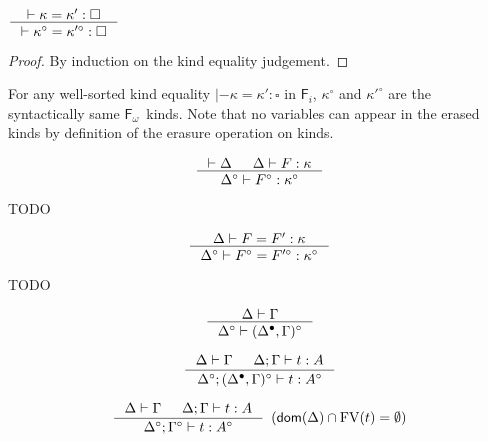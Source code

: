\documentclass{llncs}
\newcommand{\Fi}{\ensuremath{\mathsf{F}_i}}
\newcommand{\Fw}{\ensuremath{\mathsf{F}_\omega}}
\newcommand{\dom}{\mathop{\mathsf{dom}}}
\newcommand{\FV}{\mathop{\mathrm{FV}}}
\begin{document}
\begin{theorem}\label{thm:ierasekindeq}
$ \inference{|- \kappa=\kappa':\square}
	{|- \kappa^\circ=\kappa'^\circ:\square}
$
\end{theorem}
\begin{proof}
	By induction on the kind equality judgement.
\end{proof}
\begin{remark}
For any well-sorted kind equality $|- \kappa=\kappa':\square$ in \Fi,
$\kappa^\circ$ and $\kappa'^\circ$ are the syntactically same \Fw\ kinds.
Note that no variables can appear in the erased kinds by definition of
the erasure operation on kinds.
\end{remark}

\begin{theorem}
\label{thm:ierasekinding}
\[ \inference{|- \Delta & \Delta |- F : \kappa}
		{\Delta^\circ |- F^\circ : \kappa^\circ}
\]
\end{theorem}
\begin{remark} TODO
\end{remark}


\begin{theorem}
\label{thm:ierasetyconeq}
\[ \inference{\Delta |- F=F':\kappa}
		{\Delta^\circ |- F^\circ=F'^\circ:\kappa^\circ}
\]
\end{theorem}
\begin{remark} TODO
\end{remark}

\begin{theorem}
\label{thm:ierasetmctxivs}
\[ \inference{\Delta |- \Gamma}{\Delta^\circ |- (\Delta^\bullet,\Gamma)^\circ}
\]
\end{theorem}

\begin{theorem}
\label{thm:ierasetypingall}
\[ \inference{\Delta |- \Gamma & \Delta;\Gamma |- t : A}
		{\Delta^\circ;(\Delta^\bullet,\Gamma)^\circ |- t : A^\circ}
\]
\end{theorem}

\begin{corollary}
\label{thm:ierasetypingifree}
\[ \inference{ \Delta |- \Gamma & \Delta;\Gamma |- t : A}
		{\Delta^\circ;\Gamma^\circ |- t : A^\circ}
		{\enspace(\dom(\Delta)\cap\FV(t) = \emptyset)}
\]
\end{corollary}
\end{document}
